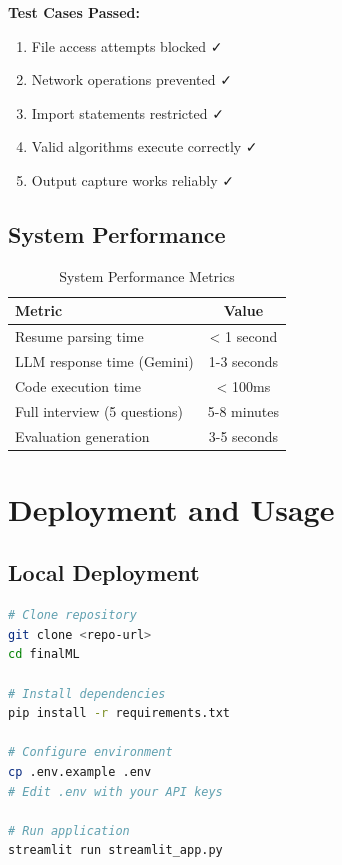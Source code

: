 \documentclass[12pt,a4paper]{article}
\begin{document}
\textbf{Test Cases Passed:}
\begin{enumerate}
    \item File access attempts blocked ✓
    \item Network operations prevented ✓
    \item Import statements restricted ✓
    \item Valid algorithms execute correctly ✓
    \item Output capture works reliably ✓
\end{enumerate}

\subsection{System Performance}

\begin{table}[h]
\centering
\begin{tabular}{|l|c|}
\hline
\textbf{Metric} & \textbf{Value} \\
\hline
Resume parsing time & < 1 second \\
LLM response time (Gemini) & 1-3 seconds \\
Code execution time & < 100ms \\
Full interview (5 questions) & 5-8 minutes \\
Evaluation generation & 3-5 seconds \\
\hline
\end{tabular}
\caption{System Performance Metrics}
\end{table}

\section{Deployment and Usage}

\subsection{Local Deployment}

\begin{lstlisting}[language=bash, caption=Setup and Run]
# Clone repository
git clone <repo-url>
cd finalML

# Install dependencies
pip install -r requirements.txt

# Configure environment
cp .env.example .env
# Edit .env with your API keys

# Run application
streamlit run streamlit_app.py
\end{lstlisting}
\end{document}
